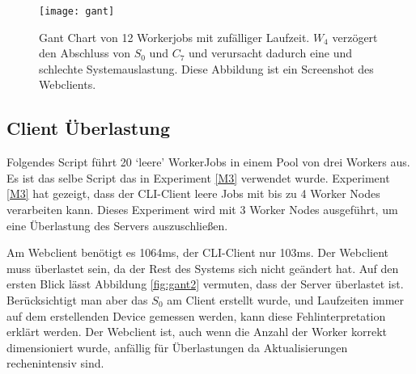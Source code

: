 \begin{figure}[H]
  \begin{center}
    \texttt{[image: gant]}
    \caption{Gant Chart von 12 Workerjobs mit zufälliger Laufzeit.
    \label{fig:gant0}
    $W_4$ verzögert den Abschluss von $S_0$ und $C_7$ und verursacht dadurch eine und schlechte Systemauslastung. Diese Abbildung ist ein Screenshot des Webclients.}
  \end{center}
\end{figure}
\noindent



\subsection{Client Überlastung}
\label{overload}
Folgendes Script führt 20 ‘leere’ WorkerJobs in einem Pool von drei Workers aus.
Es ist das selbe Script das in Experiment \ref{M3} verwendet wurde.
Experiment \ref{M3} hat gezeigt, dass der CLI-Client leere Jobs mit bis zu 4 Worker Nodes verarbeiten kann.
Dieses Experiment wird mit 3 Worker Nodes ausgeführt, um eine Überlastung des Servers auszuschließen.

Am Webclient benötigt es 1064ms, der CLI-Client nur 103ms.
Der Webclient muss überlastet sein, da der Rest des Systems sich nicht geändert hat.
Auf den ersten Blick lässt Abbildung \ref{fig:gant2} vermuten, dass der Server überlastet ist.
Berücksichtigt man aber das $S_0$ am Client erstellt wurde, und Laufzeiten immer auf dem erstellenden Device gemessen werden, kann diese Fehlinterpretation erklärt werden.
Der Webclient ist, auch wenn die Anzahl der Worker korrekt dimensioniert wurde, anfällig für Überlastungen da \GUI{} Aktualisierungen rechenintensiv sind.


